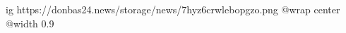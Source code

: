  
 
 
 
 

\ifcmt
  ig https://donbas24.news/storage/news/7hyz6crwlebopgzo.png
  @wrap center
  @width 0.9
\fi
